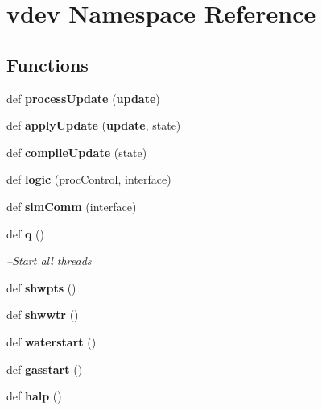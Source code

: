 \section{vdev Namespace Reference}
\label{namespacevdev}
\subsection*{Functions}
\begin{DoxyCompactItemize}
\item 
def {\bf process\+Update} ({\bf update})
\item 
def {\bf apply\+Update} ({\bf update}, state)
\item 
def {\bf compile\+Update} (state)
\item 
def {\bf logic} (proc\+Control, interface)
\item 
def {\bf sim\+Comm} (interface)
\item 
def {\bf q} ()
\begin{DoxyCompactList}\small\item\em --Start all threads \end{DoxyCompactList}\item 
def {\bf shwpts} ()
\item 
def {\bf shwwtr} ()
\item 
def {\bf waterstart} ()
\item 
def {\bf gasstart} ()
\item 
def {\bf halp} ()
\end{DoxyCompactItemize}
